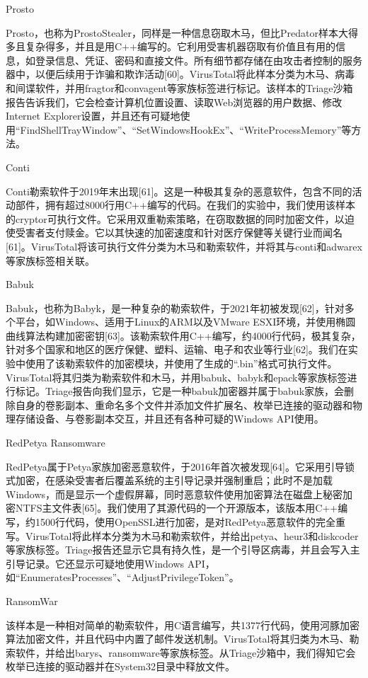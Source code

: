 Prosto

Prosto，也称为ProstoStealer，同样是一种信息窃取木马，但比Predator样本大得多且复杂得多，并且是用C++编写的。它利用受害机器窃取有价值且有用的信息，如登录信息、凭证、密码和直接文件。所有细节都存储在由攻击者控制的服务器中，以便后续用于诈骗和欺诈活动[60]。VirusTotal将此样本分类为木马、病毒和间谍软件，并用fragtor和convagent等家族标签进行标记。该样本的Triage沙箱报告告诉我们，它会检查计算机位置设置、读取Web浏览器的用户数据、修改Internet Explorer设置，并且还有可疑地使用“FindShellTrayWindow”、“SetWindowsHookEx”、“WriteProcessMemory”等方法。

Conti

Conti勒索软件于2019年末出现[61]。这是一种极其复杂的恶意软件，包含不同的活动部件，拥有超过8000行用C++编写的代码。在我们的实验中，我们使用该样本的cryptor可执行文件。它采用双重勒索策略，在窃取数据的同时加密文件，以迫使受害者支付赎金。它以其快速的加密速度和针对医疗保健等关键行业而闻名[61]。VirusTotal将该可执行文件分类为木马和勒索软件，并将其与conti和adwarex等家族标签相关联。

Babuk

Babuk，也称为Babyk，是一种复杂的勒索软件，于2021年初被发现[62]，针对多个平台，如Windows、适用于Linux的ARM以及VMware ESXI环境，并使用椭圆曲线算法构建加密密钥[63]。该勒索软件用C++编写，约4000行代码，极其复杂，针对多个国家和地区的医疗保健、塑料、运输、电子和农业等行业[62]。我们在实验中使用了该勒索软件的加密模块，并使用了生成的“.bin”格式可执行文件。VirusTotal将其归类为勒索软件和木马，并用babuk、babyk和epack等家族标签进行标记。Triage报告向我们显示，它是一种babuk加密器并属于babuk家族，会删除自身的卷影副本、重命名多个文件并添加文件扩展名、枚举已连接的驱动器和物理存储设备、与卷影副本交互，并且还有各种可疑的Windows API使用。

RedPetya Ransomware

RedPetya属于Petya家族加密恶意软件，于2016年首次被发现[64]。它采用引导锁式加密，在感染受害者后覆盖系统的主引导记录并强制重启；此时不是加载Windows，而是显示一个虚假屏幕，同时恶意软件使用加密算法在磁盘上秘密加密NTFS主文件表[65]。我们使用了其源代码的一个开源版本，该版本用C++编写，约1500行代码，使用OpenSSL进行加密，是对RedPetya恶意软件的完全重写。VirusTotal将此样本分类为木马和勒索软件，并给出petya、heur3和diskcoder等家族标签。Triage报告还显示它具有持久性，是一个引导区病毒，并且会写入主引导记录。它还显示可疑地使用Windows API，如“EnumeratesProcesses”、“AdjustPrivilegeToken”。

RansomWar

该样本是一种相对简单的勒索软件，用C语言编写，共1377行代码，使用河豚加密算法加密文件，并且代码中内置了邮件发送机制。VirusTotal将其归类为木马、勒索软件，并给出barys、ransomware等家族标签。从Triage沙箱中，我们得知它会枚举已连接的驱动器并在System32目录中释放文件。


